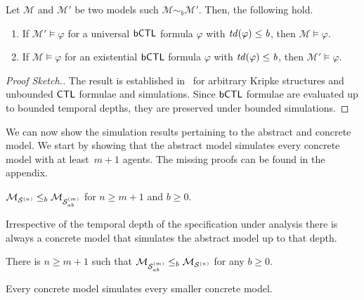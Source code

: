 \begin{theorem} Let $\mathcal M$ and $\mathcal M'$ be two models such $\mathcal
M \sim_b  \mathcal M'$. Then, the following hold.
\label{th:sim}
\begin{enumerate}
    \item If $\mathcal M' \models \varphi$ for a universal $\sf{bCTL}$ formula
    $\varphi$ with $\it{td}(\varphi) \leq b$, then $\mathcal M \models
    \varphi$.
    \item If $\mathcal M \models \varphi$ for an existential $\sf{bCTL}$ formula
    $\varphi$ with $\it{td}(\varphi) \leq b$, then $\mathcal M' \models
    \varphi$.
\end{enumerate}
\end{theorem}
\begin{proof}[Proof Sketch.]
The result is established in~\cite{ClarkeGrumbergLong94} for arbitrary Kripke
structures and unbounded $\sf{CTL}$ formulae and simulations. Since $\sf{bCTL}$ formulae
are evaluated up to bounded temporal depths, they are preserved under bounded
simulations.
\end{proof}

We can now show the simulation results pertaining to the abstract and concrete
model.  We start by showing that the abstract model simulates every concrete
model with at least~$m+1$ agents. The missing proofs can be found in the
appendix.

\begin{theorem}
\label{th:ab-concr-sim}
$\mathcal{M}_{\mathcal{S}^{(n)}} \leq_b \mathcal{M}_{\mathcal{S}_{ab}^{(m)}}$ for $n \geq m+1$ and $b \geq 0$.
\end{theorem}

Irrespective of the temporal depth of the specification under
analysis there is always a concrete model that simulates the abstract model up
to that depth.

\begin{theorem}
\label{th:concr-ab-sim}
There is $n \geq m+1$ such that $\mathcal{M}_{\mathcal{S}_{ab}^{(m)}} \leq_b \mathcal{M}_{\mathcal{S}^{(n)}}$ for any $b \geq 0$.
\end{theorem}


Every concrete model simulates every smaller concrete model.

